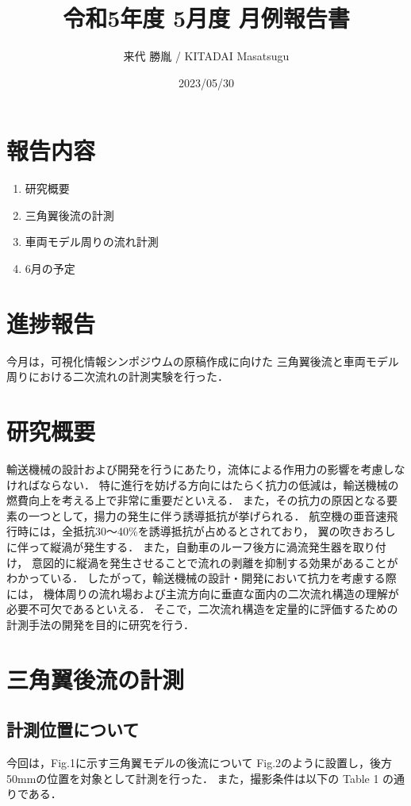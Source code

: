 \documentclass[twocolumn,a4j]{jsarticle}
\author{来代 勝胤 / KITADAI Masatsugu}
\title{令和5年度 5月度 月例報告書}
\date{2023/05/30}
\begin{document}
\columnseprule=0.1mm
\maketitle

\section*{報告内容}
\begin{enumerate}[1.]
  \item 研究概要
  \item 三角翼後流の計測
  \item 車両モデル周りの流れ計測
  \item 6月の予定
\end{enumerate}

\section*{進捗報告}
今月は，可視化情報シンポジウムの原稿作成に向けた
三角翼後流と車両モデル周りにおける二次流れの計測実験を行った．

\section{研究概要}
輸送機械の設計および開発を行うにあたり，流体による作用力の影響を考慮しなければならない．
特に進行を妨げる方向にはたらく抗力の低減は，輸送機械の燃費向上を考える上で非常に重要だといえる．
また，その抗力の原因となる要素の一つとして，揚力の発生に伴う誘導抵抗が挙げられる．
航空機の亜音速飛行時には，全抵抗30～40\%を誘導抵抗が占めるとされており，
翼の吹きおろしに伴って縦渦が発生する．
また，自動車のルーフ後方に渦流発生器を取り付け，
意図的に縦渦を発生させることで流れの剥離を抑制する効果があることがわかっている．
したがって，輸送機械の設計・開発において抗力を考慮する際には，
機体周りの流れ場および主流方向に垂直な面内の二次流れ構造の理解が必要不可欠であるといえる．
そこで，二次流れ構造を定量的に評価するための計測手法の開発を目的に研究を行う．

\section{三角翼後流の計測}

\subsection{計測位置について}
今回は，Fig.1に示す三角翼モデルの後流について
Fig.2のように設置し，後方50mmの位置を対象として計測を行った．
また，撮影条件は以下の Table 1 の通りである．
\end{document}
